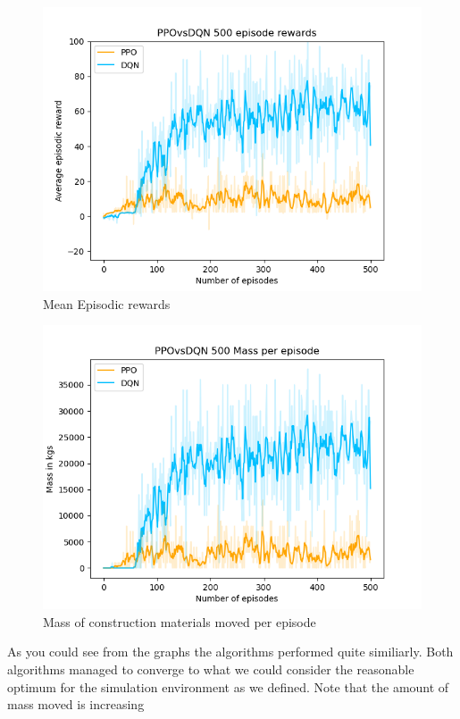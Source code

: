 \documentclass[conference]{IEEEtran}
\begin{document}
	\begin{figure}[h!]
		\includegraphics[width=\columnwidth]{graphs/PPOvsDQN500rews.png}
		\caption{Mean Episodic rewards}
	\end{figure}
	\begin{figure}[h!]
		\includegraphics[width=\columnwidth]{graphs/PPOvsDQN500mass.png}
		\caption{Mass of construction materials moved per episode}
	\end{figure}

	As you could see from the graphs the algorithms performed quite similiarly.
	Both algorithms managed to converge to what we could consider the reasonable optimum for the simulation
	environment as we defined. Note that the amount of mass moved is increasing
\end{document}
